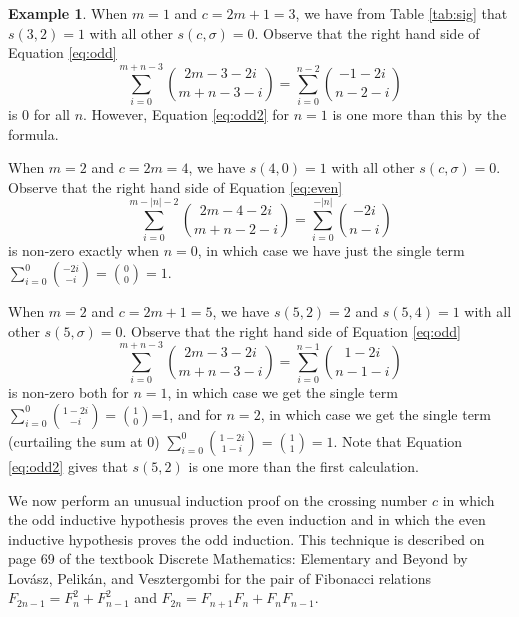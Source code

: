 \documentclass[11pt]{amsart}
\theoremstyle{definition}
\newtheorem{example}[theorem]{Example}
\theoremstyle{remark}
\numberwithin{equation}{section}
\begin{document}
\begin{example}
    \label{ex:basecases}
When $m=1$ and $c=2m+1=3$,  
we have from Table \ref{tab:sig} that $s(3,2)=1$ with all other $s(c,\sigma)=0$.  Observe that the right hand side of Equation \eqref{eq:odd}
\[    \sum_{i=0}^{m+n-3}{2m-3-2i\choose m+n-3-i}= \sum_{i=0}^{n-2}{-1-2i\choose n-2-i}\]
is 0 for all $n$.  However, Equation \eqref{eq:odd2} for $n=1$ is one more than this by the formula.

When $m=2$ and $c=2m=4$, we have $s(4,0)=1$ with all other $s(c,\sigma)=0$.  Observe that the right hand side of Equation \eqref{eq:even}
\[\sum_{i=0}^{m-|n|-2}{2m-4-2i\choose m+n-2-i}=\sum_{i=0}^{-|n|}{-2i\choose n-i}\]
is non-zero exactly when $n=0$, in which case we have just the single term  $\sum_{i=0}^{0}{-2i\choose -i}={0\choose 0}=1$.

When $m=2$ and $c=2m+1=5$, we have $s(5,2)=2$ and $s(5,4)=1$ with all other $s(5,\sigma)=0$.  Observe that the right hand side of Equation \eqref{eq:odd}
\[    \sum_{i=0}^{m+n-3}{2m-3-2i\choose m+n-3-i}= \sum_{i=0}^{n-1}{1-2i\choose n-1-i}\]
is non-zero both for $n=1$, in which case we get the single term $\sum_{i=0}^{0}{1-2i\choose -i}={1 \choose 0}$=1, and for $n=2$, in which case we get the single term (curtailing the sum at $0$) $\sum_{i=0}^{0}{1-2i\choose 1-i}={1 \choose 1} =1$.  Note that Equation \eqref{eq:odd2} gives that $s(5,2)$ is one more than the first calculation.
\end{example}




    




We now perform an unusual induction proof on the crossing number $c$ in which the odd inductive hypothesis proves the even induction and in which the even inductive hypothesis proves the odd induction.  This technique is described on page 69 of the textbook Discrete Mathematics:  Elementary and Beyond by Lov{\'a}sz, Pelik{\'a}n, and Vesztergombi \cite{lovasz2003discrete} for the pair of Fibonacci relations $F_{2n-1}=F_n^2+F_{n-1}^2$ and $F_{2n}=F_{n+1}F_{n}+F_{n}F_{n-1}$.
\end{document}
